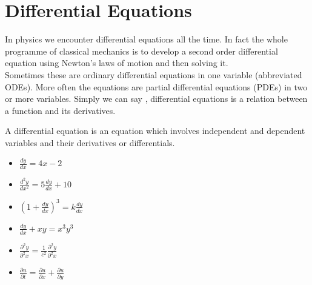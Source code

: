 \chapter{Differential Equations}
In physics we encounter differential equations all the time. In fact the whole programme of classical mechanics is to develop a second order differential equation using Newton's laws of motion and then solving it.\\Sometimes these are ordinary
differential equations in one variable (abbreviated ODEs). More often the equations are
partial differential equations (PDEs) in two or more variables. Simply we can say , differential equations is a relation between a function and its derivatives.
\begin{definition}
	A differential equation is an equation which involves independent and dependent variables and their derivatives or differentials.
\end{definition}
\begin{example}
	\hspace{1cm}
\begin{itemize}
		\item $\frac{dy}{dx}={4x-2}$
		\item $\frac{d^{2}y}{dx^{2}}=5\frac{dy}{dx}+10$
		\item $(1+\frac{dy}{dx})^{3}=k\frac{dy}{dx}$
		\item $\frac{dy}{dx}+xy=x^{3}y^{3}$
		\item $\frac{\partial^{2}y}{\partial^{2} x}=\frac{1}{c^{2}} \frac{\partial^{2}y}{\partial^{2} x} $
		\item $\frac{\partial u}{\partial t}=\frac{\partial u}{\partial x}+\frac{\partial u}{\partial y}$
	\end{itemize}
\end{example}
